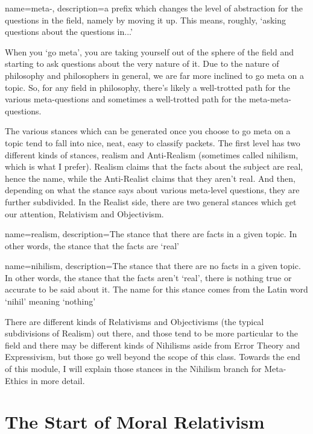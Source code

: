 {
  name=meta-,
  description={a prefix which changes the level of abstraction for the questions in the field, namely by moving it up. This means, roughly, `asking questions about the questions in...'}
}


When you ‘go meta’, you are taking yourself out of the sphere of the field and starting to ask questions about the very nature of it. Due to the nature of philosophy and philosophers in general, we are far more inclined to go meta on a topic. So, for any field in philosophy, there’s likely a well-trotted path for the various meta-questions and sometimes a well-trotted path for the meta-meta-questions.

The various stances which can be generated once you choose to go meta on a topic tend to fall into nice, neat, easy to classify packets. The first level has two different kinds of stances, \Gls{realism} and Anti-Realism (sometimes called \Gls{nihilism}, which is what I prefer). Realism claims that the facts about the subject are real, hence the name, while the Anti-Realist claims that they aren't real. And then, depending on what the stance says about various meta-level questions, they are further subdivided. In the Realist side, there are two general stances which get our attention, Relativism and Objectivism.

{
  name=realism,
  description={The stance that there are facts in a given topic. In other words, the stance that the facts are `real'}
}

{
  name=nihilism,
  description={The stance that there are no facts in a given topic. In other words, the stance that the facts aren't `real', there is nothing true or accurate to be said about it. The name for this stance comes from the Latin word `nihil' meaning `nothing'}
}


There are different kinds of Relativisms and Objectivisms (the typical subdivisions of Realism) out there, and those tend to be more particular to the field and there may be different kinds of Nihilisms aside from Error Theory and Expressivism, but those go well beyond the scope of this class. Towards the end of this module, I will explain those stances in the Nihilism branch for Meta-Ethics in more detail.

\section{The Start of Moral Relativism}

